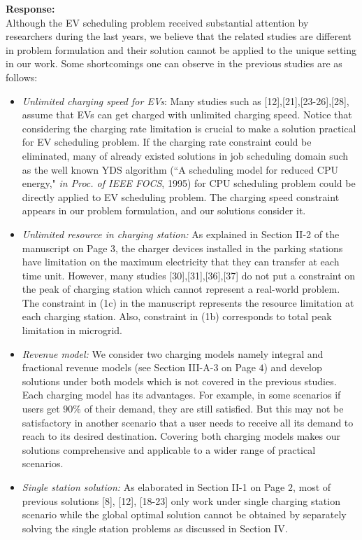 \documentclass[11pt]{article}
\begin{document}
\vspace{7mm}
\noindent\textbf{Response:}\\
Although the EV scheduling problem received substantial attention by researchers during the last years, we believe that the related studies are different in problem formulation and their solution cannot be applied to the unique setting in our work. Some shortcomings one can observe in the previous studies are as follows:

\begin{itemize}

\item \emph{Unlimited charging speed for EVs}: Many studies such as [12],[21],[23-26],[28], %
assume that EVs can get charged with unlimited charging speed. Notice that considering the charging rate limitation is crucial to make a solution practical for EV scheduling problem. If the charging rate constraint could be eliminated, many of already existed solutions in job scheduling domain such as the well known YDS algorithm 
(``A scheduling model for reduced CPU energy," \emph{in
Proc. of IEEE FOCS}, 1995) for CPU scheduling problem could be directly applied to EV scheduling problem. The charging speed constraint appears in our problem formulation, and our solutions consider it.

\item \emph{Unlimited resource in charging station:} As explained in Section II-2 of the manuscript on Page $3$, the charger devices installed in the parking stations have limitation
on the maximum electricity that they can transfer at each time unit. However, many studies 
[30],[31],[36],[37]
do not put a constraint on the peak of charging station which cannot represent a real-world problem. The constraint in (1c) in the manuscript represents the resource limitation at each charging station. Also, constraint in (1b) corresponds to total peak limitation in microgrid.

\item \emph{Revenue model:} We consider two charging models namely integral and fractional revenue models (see Section III-A-3 on Page $4$) and develop solutions under both models which is not covered in the previous studies. Each charging model has its advantages. For example, in some scenarios if users get $90\%$ of their demand, they are still satisfied. But this may not be satisfactory in another scenario that a user needs to receive all its demand to reach to its desired destination. Covering both charging models makes our solutions comprehensive and applicable to a wider range of practical scenarios.

\item \emph{Single station solution:}
As elaborated in Section II-1 on Page $2$,  most of previous solutions [8], [12], [18-23] only work under single charging station scenario while the global optimal solution cannot be obtained by separately solving the single station problems as discussed in Section IV.

\end{itemize}
\end{document}

